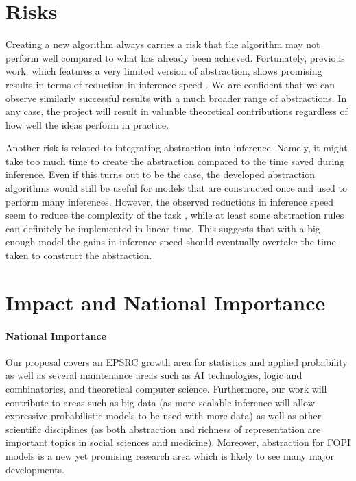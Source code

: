 \documentclass[11pt,english,twocolumn]{article}
\begin{document}
\section{Risks} %

Creating a new algorithm always carries a risk that the algorithm may not
perform well compared to what has already been achieved. Fortunately, previous
work, which features a very limited version of abstraction, shows promising
results in terms of reduction in inference speed
\cite{DBLP:conf/icml/HoltzenBM18}. We are confident that we can observe
similarly successful results with a much broader range of abstractions. In any
case, the project will result in valuable theoretical contributions regardless
of how well the ideas perform in practice.

Another risk is related to integrating abstraction into inference. Namely, it
might take too much time to create the abstraction compared to the time saved
during inference. Even if this turns out to be the case, the developed
abstraction algorithms would still be useful for models that are constructed
once and used to perform many inferences. However, the observed reductions in
inference speed seem to reduce the complexity of the task
\cite{DBLP:conf/icml/HoltzenBM18}, while at least some abstraction rules can
definitely be implemented in linear time. This suggests that with a big enough
model the gains in inference speed should eventually overtake the time taken to
construct the abstraction.

\section{Impact and National Importance} %

\paragraph{National Importance}

Our proposal covers an EPSRC growth area for statistics and applied probability
as well as several maintenance areas such as AI technologies, logic and
combinatorics, and theoretical computer science. Furthermore, our work will
contribute to areas such as big data (as more scalable inference will allow
expressive probabilistic models to be used with more data) as well as other
scientific disciplines (as both abstraction and richness of representation are
important topics in social sciences and medicine). Moreover, abstraction for
FOPI models is a new yet promising research area
\cite{DBLP:conf/icml/HoltzenBM18} which is likely to see many major
developments.
\end{document}
